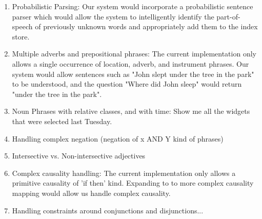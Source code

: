 \documentclass[10pt]{article}
\begin{document}
\begin{enumerate}
\item{
Probabilistic Parsing: Our system would incorporate a probabilistic sentence parser which would allow the system to intelligently identify the part-of-speech of previously unknown words and appropriately add them to the index store.
}

\item{
Multiple adverbs and prepositional phrases: The current implementation only allows a single occurrence of location, adverb, and instrument phrases. Our system would allow sentences such as "John slept under the tree in the park" to be understood, and the question "Where did John sleep" would return "under the tree in the park".
}

\item{
Noun Phrases with relative classes, and with time:  Show me all the widgets that were selected last Tuesday.
}

\item{
Handling complex negation (negation of x AND Y kind of phrases)
}

\item{
Intersective vs. Non-intersective adjectives
}

\item{
Complex causality handling: The current implementation only allows a primitive causality of 'if then' kind. Expanding to to more complex causality mapping would allow us handle complex causality.
}

\item{
Handling constraints around conjunctions and disjunctions...
}

\end{enumerate}



 
\end{document}
